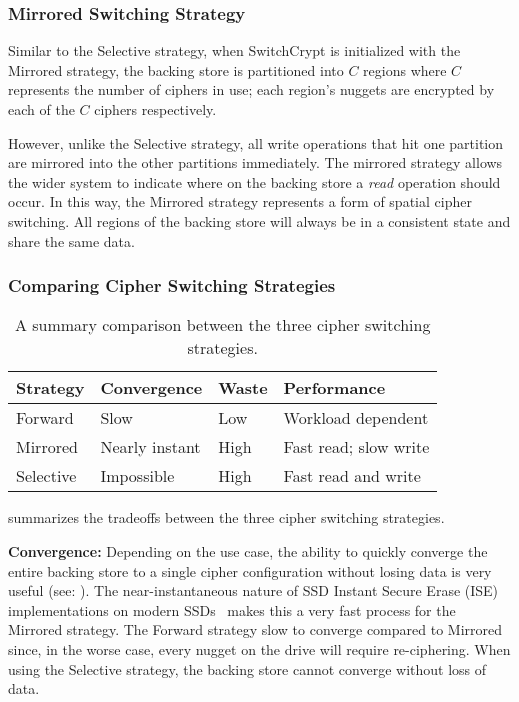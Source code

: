 \subsubsection{Mirrored Switching Strategy}

Similar to the Selective strategy, when SwitchCrypt is initialized with the
Mirrored strategy, the backing store is partitioned into $C$ regions where $C$
represents the number of ciphers in use; each region's nuggets are encrypted by
each of the $C$ ciphers respectively.

However, unlike the Selective strategy, all write operations that hit one
partition are mirrored into the other partitions immediately. The mirrored
strategy allows the wider system to indicate where on the backing store a
\emph{read} operation should occur. In this way, the Mirrored strategy
represents a form of spatial cipher switching. All regions of the backing store
will always be in a consistent state and share the same data.

\subsubsection{Comparing Cipher Switching Strategies}

\begin{table}[]
   \begin{tabular}{@{}|l|l|l|l|@{}}
      \toprule
      \textbf{Strategy} & \textbf{Convergence} & \textbf{Waste} & \textbf{Performance} \\ \midrule
      Forward   & Slow           & Low  & Workload dependent    \\
      \hline
      Mirrored  & Nearly instant & High & Fast read; slow write \\
      \hline
      Selective & Impossible     & High & Fast read and write   \\
      \hline
   \end{tabular}
   \caption{A summary comparison between the three cipher switching strategies.}
   \label{tbl:strategies-advantages}
\end{table}

 summarizes the tradeoffs between the three cipher
switching strategies.

\textbf{Convergence:} Depending on the use case, the ability to quickly converge
the entire backing store to a single cipher configuration without losing data is
very useful (see: ). The near-instantaneous nature of SSD
Instant Secure Erase (ISE) implementations on modern SSDs~\cite{ISE1,ISE2,ISE3}
makes this a very fast process for the Mirrored strategy. The Forward strategy
slow to converge compared to Mirrored since, in the worse case, every nugget on
the drive will require re-ciphering. When using the Selective strategy, the
backing store cannot converge without loss of data.

